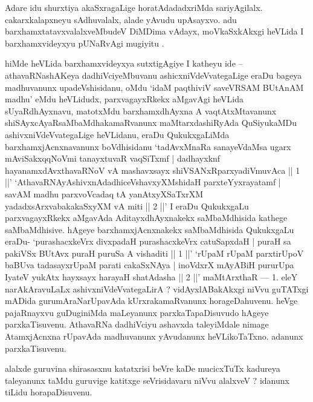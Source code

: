 \begin{center}


\end{center}

\begin{artha}
Adare idu shurxtiya akaSxragaLige horatAdadadxriMda sariyAgilalx. cakarxkalapxneyu  sAdhuvalalx, alade yAvudu upAsayxvo. adu barxhamxtatavxvalalxveMbudeV DiMDima\-	vAdayx,  moVkaSxkAkxgi heVLida I barxhamxvideyxyu pUNaRvAgi mugiyitu .
\end{artha}

\begin{artha}
hiMde heVLida barxhamxvideyxya sutxtigAgiye I katheyu ide -- athavaRNa\-shAKeya dadhiVciyeMbuvanu ashicxniVdeVvategaLige eraDu bageya madhuvanunx upa\-deVshisidanu, oMdu `idaM paqthiviV saveVRSAM BUtAnAM madhu' eMdu heVLidudx, parxvagayxRkekx aMgavAgi heVLida sUyaRdhAyxnavu, matotxMdu barxhamxdhAyxna A vaqtAtxMta\-vanunx shiSAyxcAyaRsaMbaMdhakamaRvanunx maMtarxdashiRyAda QuSiyukaMDu \break ashivxniVdeVvategaLige heVLidanu, eraDu QukukxgaLiMda barxhamxjAcnxnavanunx boVdhisidanu \break`tadAvxMnaRa sanayeVdaMsa ugarx mAviSakxqqNoVmi tanayxtuvaR vaqSiTxmf | dadhayxknf hayanamxdAvxthavaRNoV vA mashavxsayx shiVSANxRparxyadiVmuvAca || 1 ||' `AthavaRNA\-yAshivxnAdadhiceVshavxyXMshidaH parxteYyxrayatamf | savAM madhu parxvoVcadaq tA \break yanAtxyXSaTxrXM yadadxsArxvabakakaSxyXM vA miti || 2 ||' I eraDu QukukxgaLu parxvagayxRkekx aMgavAda AditayxdhAyxnakekx saMbaMdhisida kathege saMbaMdhisive. hAgeye barxhamx\-jAcnxnakekx saMbaMdhisida QukukxgaLu eraDu- `purashacxkeVrx divxpadaH purashacxkeVrx catuSapxdaH | puraH sa pakiVSx BUtAvx puraH puruSa A vishaditi || 1 ||' `rUpaM rUpaM parxtirUpoV baBUva tadasayx\-rUpaM parati cakaSxNAya | inoVdxrX mAyABiH pururUpa IyateV yukAtx hayxsayx harayaH shatAdasha || 2 ||'  maMtArxthaR {\rm ---}  1. eleY narAkAravuLaLx ashivxniVdeVvate\-gaLirA ? vidAyxlABakAkxgi niVvu guTATxgi mADida gurumAraNarUpavAda kUrxra\-kamaRvanunx horageDahuvenu. heVge pajaRnayxvu guDuginiMda maLeyanunx parxkaTa\-paDisuvudo hAgeye parxkaTisuvenu. AthavaRNa dadhiVciyu ashavxda \-taleyiMdale nimage AtamxjAcnxna rUpavAda madhuvanunx yAvudanunx heVLikoTaTxno. adanunx parxkaTisuvenu.
\end{artha}

\begin{artha}
alalxde guruvina shirasasxnu katatxrisi beVre kaDe mucicxTuTx kadureya taleyanunx taMdu guruvige katitxge seVrisidavaru niVvu alalxveV ? idanunx tiLidu horapaDisuvenu.
\end{artha}

